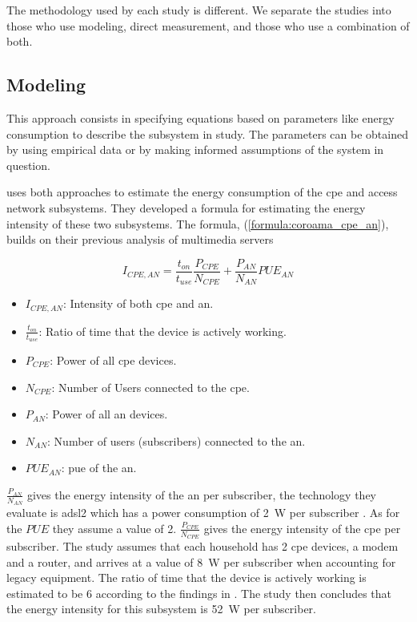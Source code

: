 The methodology used by each study is different. We separate the studies into those who use modeling, direct measurement, and those who use a combination of both.

\subsection{Modeling}

This approach consists in specifying equations based on parameters like energy consumption to describe the subsystem in study. The parameters can be obtained by using empirical data or by making informed assumptions of the system in question. 

\citet{Coroama2015} uses both approaches to estimate the energy consumption of the \ac{cpe} and access network subsystems. They developed a formula for estimating the energy intensity of these two subsystems. The formula, (\ref{formula:coroama_cpe_an}), builds on their previous analysis of multimedia servers \citet{Schien2013} 

\begin{equation}
\label{formula:coroama_cpe_an}
    I_{CPE,AN} = \frac{t_{on}}{t_{use}} \frac{P_{CPE}}{N_{CPE}} + \frac{P_{AN}}{N_{AN}} PUE_{AN}
\end{equation}

\begin{itemize}
    \item $I_{CPE,AN}$: Intensity of both \ac{cpe} and \ac{an}.
    \item $\frac{t_{on}}{t_{use}}$: Ratio of time that the device is actively working. 
    \item $P_{CPE}$: Power of all \ac{cpe} devices.
    \item $N_{CPE}$: Number of Users connected to the \ac{cpe}.
    \item $P_{AN}$: Power of all \ac{an} devices.
    \item $N_{AN}$: Number of users (subscribers) connected to the \ac{an}.
    \item $PUE_{AN}$: \ac{pue} of the \ac{an}.
\end{itemize}

$\frac{P_{AN}}{N_{AN}}$ gives the energy intensity of the \ac{an} per subscriber, the technology they evaluate is \ac{adsl2} which has a power consumption of \SI{2}{\watt} per subscriber \citet{Schien2013}. As for the $PUE$ they assume a value of 2. 
$\frac{P_{CPE}}{N_{CPE}}$ gives the energy intensity of the \ac{cpe} per subscriber. The study assumes that each household has 2 \ac{cpe} devices, a modem and a router, and arrives at a value of \SI{8}{\watt} per subscriber when accounting for legacy equipment. 
The ratio of time that the device is actively working is estimated to be 6 according to the findings in \citet{Nissen2007}.
The study then concludes that the energy intensity for this subsystem is \SI{52}{\watt} per subscriber.


